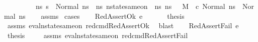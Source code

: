 \begin{isabellebody}
\ \ \ \ \ \ \ \ \ {\isacharparenleft}{\kern0pt}{\isasymforall}ns{}{\isacharprime}{\kern0pt}{\isachardot}{\kern0pt}\ s{\isacharprime}{\kern0pt}\ {\isacharequal}{\kern0pt}\ Normal\ ns{}{\isacharprime}{\kern0pt}\ {\isasymlongrightarrow}\ {\isacharparenleft}{\kern0pt}{\isasymexists}ns{}{\isacharprime}{\kern0pt}{\isachardot}{\kern0pt}\ nstate{\isacharunderscore}{\kern0pt}same{\isacharunderscore}{\kern0pt}on\ {\isasymLambda}\ ns{}{\isacharprime}{\kern0pt}\ ns{}{\isacharprime}{\kern0pt}\ {\isacharbraceleft}{\kern0pt}{\isacharbraceright}{\kern0pt}\ {\isasymand}\ M{\isacharcomma}{\kern0pt}{\isasymLambda}{\isacharcomma}{\kern0pt}{\isasymGamma}{\isacharcomma}{\kern0pt}{\isasymOmega}\ {\isasymturnstile}\ {\isasymlangle}c{\isacharcomma}{\kern0pt}\ Normal\ ns{}{\isasymrangle}\ {\isasymrightarrow}\ Normal\ ns{}{\isacharprime}{\kern0pt}{\isacharparenright}{\kern0pt}{\isacharparenright}{\kern0pt}{\isachardoublequoteclose}\isanewline
%
\isadelimproof
\ \ %
\endisadelimproof
%
\isatagproof
{}\isamarkupfalse%
\ assms\isanewline
{}\isamarkupfalse%
\ cases\isanewline
\ \ \isamarkupfalse%
\ {\isacharparenleft}{\kern0pt}RedAssertOk\ e{\isacharparenright}{\kern0pt}\isanewline
\ \ \ \isamarkupfalse%
\ \isamarkupfalse%
\ {\isacharquery}{\kern0pt}thesis\ \isanewline
\ \ \isamarkupfalse%
\ assms{\isacharparenleft}{\kern0pt}{}{\isacharparenright}{\kern0pt}\ eval{\isacharunderscore}{\kern0pt}nstate{\isacharunderscore}{\kern0pt}same{\isacharunderscore}{\kern0pt}on{\isacharparenleft}{\kern0pt}{}{\isacharparenright}{\kern0pt}\ red{\isacharunderscore}{\kern0pt}cmd{\isachardot}{\kern0pt}RedAssertOk\ \isamarkupfalse%
\ blast\isanewline
{}\isamarkupfalse%
\isanewline
\ \ \isamarkupfalse%
\ {\isacharparenleft}{\kern0pt}RedAssertFail\ e{\isacharparenright}{\kern0pt}\isanewline
\ \ \isamarkupfalse%
\ \isamarkupfalse%
\ {\isacharquery}{\kern0pt}thesis\ \isanewline
\ \ \isamarkupfalse%
\ assms{\isacharparenleft}{\kern0pt}{}{\isacharparenright}{\kern0pt}\ eval{\isacharunderscore}{\kern0pt}nstate{\isacharunderscore}{\kern0pt}same{\isacharunderscore}{\kern0pt}on{\isacharparenleft}{\kern0pt}{}{\isacharparenright}{\kern0pt}\ red{\isacharunderscore}{\kern0pt}cmd{\isachardot}{\kern0pt}RedAssertFail\ \isamarkupfalse%

\end{isabellebody}
